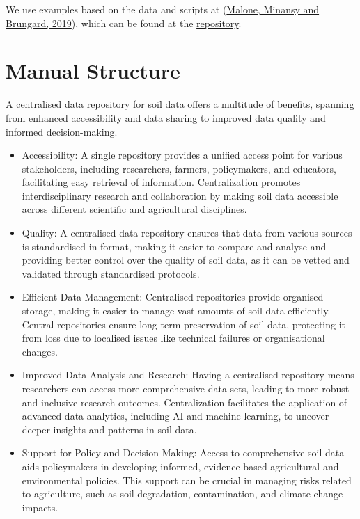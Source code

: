 \documentclass[
]{book}
\providecommand{\tightlist}{%
  \setlength{\itemsep}{0pt}\setlength{\parskip}{0pt}}
\begin{document}
We use examples based on the data and scripts at (\protect\hyperlink{ref-Malone}{Malone, Minansy and Brungard, 2019}), which can be found at the \href{https://bitbucket.org/brendo1001/clhc_sampling/src/master/}{repository}.

\hypertarget{manual-structure}{%
\section{Manual Structure}\label{manual-structure}}

A centralised data repository for soil data offers a multitude of benefits, spanning from enhanced accessibility and data sharing to improved data quality and informed decision-making.

\begin{itemize}
\tightlist
\item
  Accessibility: A single repository provides a unified access point for various stakeholders, including researchers, farmers, policymakers, and educators, facilitating easy retrieval of information. Centralization promotes interdisciplinary research and collaboration by making soil data accessible across different scientific and agricultural disciplines.
\item
  Quality: A centralised data repository ensures that data from various sources is standardised in format, making it easier to compare and analyse and providing better control over the quality of soil data, as it can be vetted and validated through standardised protocols.
\item
  Efficient Data Management: Centralised repositories provide organised storage, making it easier to manage vast amounts of soil data efficiently. Central repositories ensure long-term preservation of soil data, protecting it from loss due to localised issues like technical failures or organisational changes.
\item
  Improved Data Analysis and Research: Having a centralised repository means researchers can access more comprehensive data sets, leading to more robust and inclusive research outcomes. Centralization facilitates the application of advanced data analytics, including AI and machine learning, to uncover deeper insights and patterns in soil data.
\item
  Support for Policy and Decision Making: Access to comprehensive soil data aids policymakers in developing informed, evidence-based agricultural and environmental policies. This support can be crucial in managing risks related to agriculture, such as soil degradation, contamination, and climate change impacts.

\end{itemize}
\end{document}
